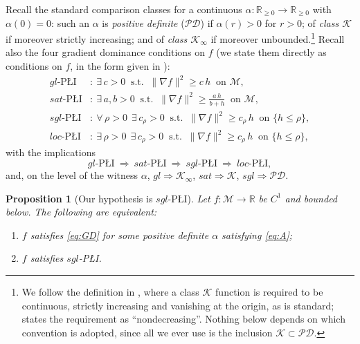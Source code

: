 \documentclass[11pt]{article}
\theoremstyle{plain}
\newtheorem{prop}[thm]{Proposition}
\theoremstyle{definition}
\theoremstyle{remark}
\newcommand{\M}{\mathcal{M}}
\newcommand{\R}{\mathbb{R}}
\begin{document}
Recall the standard comparison classes for a continuous
$\alpha\colon\R_{\ge0}\to\R_{\ge0}$ with $\alpha(0)=0$: such an $\alpha$ is
\emph{positive definite} ($\mathcal{PD}$) if $\alpha(r)>0$ for $r>0$; of
\emph{class $\mathcal{K}$} if moreover strictly increasing; and of \emph{class
$\mathcal{K}_\infty$} if moreover unbounded.\footnote{We follow the definition in
\cite{CuiJiangSontag2024}, where a class $\mathcal{K}$ function is required to be
continuous, strictly increasing and vanishing at the origin, as is standard;
\cite{Sontag2025L4DC} states the requirement as ``nondecreasing''. Nothing below
depends on which convention is adopted, since all we ever use is the inclusion
$\mathcal{K}\subset\mathcal{PD}$.} Recall also the four gradient
dominance conditions on $f$ (we state them directly as conditions on $f$, in the
form given in \cite[\S2]{Sontag2025L4DC}):
\begin{align*}
  gl\text{-P\L{}I}  &: \ \exists\, c>0 \ \text{ s.t. } \ \|\nabla f\|^2 \ge c\,h \ \text{ on } \M ,\\
  sat\text{-P\L{}I} &: \ \exists\, a,b>0 \ \text{ s.t. } \ \|\nabla f\|^2 \ge \frac{a\,h}{b+h} \ \text{ on } \M ,\\
  sgl\text{-P\L{}I} &: \ \forall\,\rho>0 \ \ \exists\, c_\rho>0 \ \text{ s.t. } \ \|\nabla f\|^2 \ge c_\rho\, h \ \text{ on } \{h\le\rho\} ,\\
  loc\text{-P\L{}I} &: \ \exists\,\rho>0 \ \ \exists\, c_\rho>0 \ \text{ s.t. } \ \|\nabla f\|^2 \ge c_\rho\, h \ \text{ on } \{h\le\rho\} ,
\end{align*}
with the implications
\[
  gl\text{-P\L{}I} \ \Longrightarrow\ sat\text{-P\L{}I} \ \Longrightarrow\
  sgl\text{-P\L{}I} \ \Longrightarrow\ loc\text{-P\L{}I} ,
\]
and, on the level of the witness $\alpha$,
$gl \Rightarrow \mathcal{K}_\infty$, $sat \Rightarrow \mathcal{K}$,
$sgl \Rightarrow \mathcal{PD}$.

\begin{prop}[Our hypothesis is $sgl$-P\L{}I]\label{prop:sgl}
Let $f\colon\M\to\R$ be $C^1$ and bounded below. The following are equivalent:
\begin{enumerate}
\item[(i)] $f$ satisfies \eqref{eq:GD} for some positive definite $\alpha$
satisfying \eqref{eq:A};
\item[(ii)] $f$ satisfies $sgl$-P\L{}I.
\end{enumerate}
\end{prop}
\end{document}
